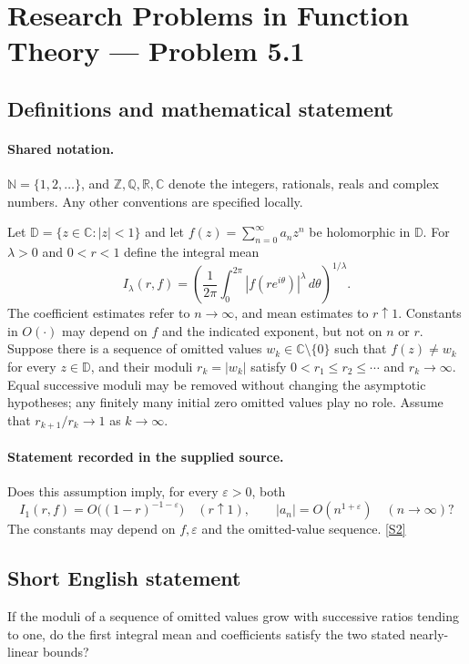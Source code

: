 \documentclass[11pt]{book}
\newcommand{\sref}[2]{\hyperlink{source:#1:#2}{[S#2]}}
\begin{document}
\section{Research Problems in Function Theory — Problem 5.1}\label{statement}

\subsection{Definitions and mathematical statement}

\paragraph{Shared notation.}$\mathbb N=\{1,2,\ldots\}$, and $\mathbb Z,\mathbb Q,\mathbb R,\mathbb C$ denote the integers, rationals, reals and complex numbers. Any other conventions are specified locally.


Let $\mathbb D=\{z\in\mathbb C:|z|<1\}$ and let $f(z)=\sum_{n=0}^\infty a_nz^n$ be holomorphic in $\mathbb D$. For $\lambda>0$ and $0<r<1$ define the integral mean
\[I_\lambda(r,f)=\left(\frac1{2\pi}\int_0^{2\pi}|f(re^{i\theta})|^\lambda\,d\theta\right)^{1/\lambda}.
\]
The coefficient estimates refer to $n\to\infty$, and mean estimates to $r\uparrow1$. Constants in $O(\cdot)$ may depend on $f$ and the indicated exponent, but not on $n$ or $r$.
Suppose there is a sequence of omitted values $w_k\in\mathbb C\setminus\{0\}$ such that $f(z)\ne w_k$ for every $z\in\mathbb D$, and their moduli $r_k=|w_k|$ satisfy $0<r_1\le r_2\le\cdots$ and $r_k\to\infty$. Equal successive moduli may be removed without changing the asymptotic hypotheses; any finitely many initial zero omitted values play no role. Assume that $r_{k+1}/r_k\to1$ as $k\to\infty$.
\paragraph{Statement recorded in the supplied source.}
Does this assumption imply, for every $\varepsilon>0$, both
\[I_1(r,f)=O\bigl((1-r)^{-1-\varepsilon}\bigr)\quad(r\uparrow1),\qquad |a_n|=O(n^{1+\varepsilon})\quad(n\to\infty)?\]
The constants may depend on $f,\varepsilon$ and the omitted-value sequence. \sref{statement}{2}
\subsection{Short English statement}
If the moduli of a sequence of omitted values grow with successive ratios tending to one, do the first integral mean and coefficients satisfy the two stated nearly-linear bounds?
\end{document}
